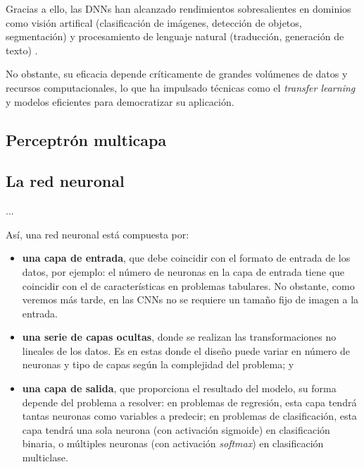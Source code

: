 Gracias a ello, las DNNs han alcanzado rendimientos sobresalientes en dominios como visión artifical
(clasificación de imágenes, detección de objetos, segmentación) y procesamiento de lenguaje natural 
(traducción, generación de texto) \cite{redhat2024DeepLearningDefinition}.

No obstante, su eficacia depende críticamente de grandes volúmenes de datos y recursos computacionales,
lo que ha impulsado técnicas como el \textit{transfer learning} y modelos eficientes para democratizar 
su aplicación.


\subsection{Perceptrón multicapa}




\subsection{La red neuronal}



...

Así, una red neuronal está compuesta por: 

\begin{itemize}

    \item \textbf{una capa de entrada}, que debe coincidir con el formato de entrada de los datos, por ejemplo: el
    número de neuronas en la capa de entrada tiene que coincidir con el de características en problemas tabulares.
    No obstante, como veremos más tarde, en las CNNs no se requiere un tamaño fijo de imagen a la entrada.
    
    \item \textbf{una serie de capas ocultas}, donde se realizan las transformaciones no lineales de los datos. 
    Es en estas donde el diseño puede variar en número de neuronas y tipo de capas según la complejidad del 
    problema; y
    
    \item \textbf{una capa de salida}, que proporciona el resultado del modelo, su forma depende del problema a 
    resolver: en problemas de regresión, esta capa tendrá tantas neuronas como variables a predecir; en problemas de 
    clasificación, esta capa tendrá una sola neurona (con activación sigmoide) en clasificación binaria, o múltiples 
    neuronas (con activación \textit{softmax}) en clasificación multiclase.

\end{itemize}


